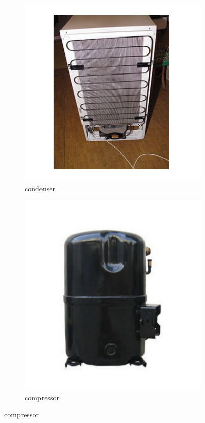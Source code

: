 \documentclass{article}
\begin{document}
\begin{figure}
  \centering
  
  \begin{subfigure}{0.45\textwidth}
      \includegraphics[width=\textwidth]{img/condenser.png}
      \caption{condenser}
      \label{subfig:condenser}
  \end{subfigure}
  \hfill
  \begin{subfigure}{0.45\textwidth}
      \includegraphics[width=\textwidth]{img/compressor.png}
      \caption{compressor}
      \label{subfig:compressor}
  \end{subfigure}
  

\end{figure}
\end{document}
